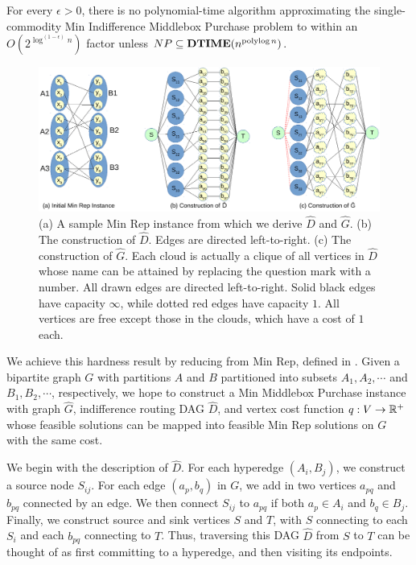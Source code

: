 \begin{theorem}
For every $\epsilon > 0$, there is no polynomial-time algorithm approximating the single-commodity {\sc Min Indifference Middlebox Purchase} problem to within an $O(2^{\log^{(1-\epsilon)}n})$ factor unless $NP \subseteq \mbox{\bf DTIME}(n^{\operatorname{polylog} n})$.
\end{theorem}
\begin{figure}[t]
\centering
 \includegraphics[width=\textwidth]{images/minrephard.pdf}
 \caption{(a) A sample {\sc Min Rep} instance from which we derive $\hat{D}$ and $\hat{G}$. (b) The construction of $\hat{D}$. Edges are directed left-to-right. (c) The construction of $\hat{G}$. Each cloud is actually a clique of all vertices in $\hat{D}$ whose name can be attained by replacing the question mark with a number. All drawn edges are directed left-to-right. Solid black edges have capacity $\infty$, while dotted red edges have capacity $1$. All vertices are free except those in the clouds, which have a cost of $1$ each.}
\label{fig:minrephard}
\end{figure}
We achieve this hardness result by reducing from {\sc Min Rep}, defined in \cite{Kortsarz01}. Given a bipartite graph $G$ with partitions $A$ and $B$ partitioned into subsets $A_1, A_2, \cdots$ and $B_1, B_2, \cdots$, respectively, we hope to construct a {\sc Min Middlebox Purchase} instance with graph $\hat{G}$, indifference routing DAG $\hat{D}$, and vertex cost function $q : V \rightarrow \mathbb{R}^+$ whose feasible solutions can be mapped into feasible {\sc Min Rep} solutions on $G$ with the same cost.

We begin with the description of $\hat{D}$. For each hyperedge $(A_i, B_j)$, we construct a source node $S_{ij}$. For each edge $(a_p, b_q)$ in $G$, we add in two vertices $a_{pq}$ and $b_{pq}$ connected by an edge. We then connect $S_{ij}$ to $a_{pq}$ if both $a_p \in A_i$ and $b_q \in B_j$. Finally, we construct source and sink vertices $S$ and $T$, with $S$ connecting to each $S_i$ and each $b_{pq}$ connecting to $T$. Thus, traversing this DAG $\hat{D}$ from $S$ to $T$ can be thought of as first committing to a hyperedge, and then visiting its endpoints.

